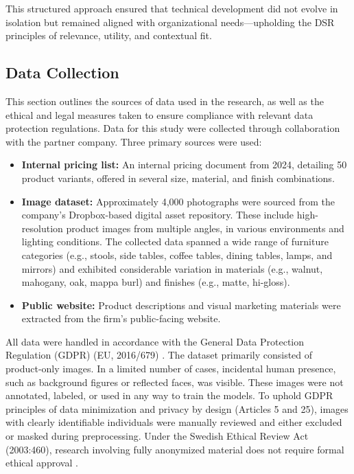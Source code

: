 \documentclass[a4paper,10pt,twocolumn]{article}
\numberwithin{figure}{section}
\numberwithin{table}{section}
\begin{document}
This structured approach ensured that technical development did not 
evolve in isolation but remained aligned with organizational needs—upholding 
the DSR principles of relevance, utility, and contextual fit. 

\subsection{Data Collection}

This section outlines the sources of data used 
in the research, as well as the ethical and legal 
measures taken to ensure compliance with relevant 
data protection regulations.
Data for this study were collected through 
collaboration with the partner company. 
Three primary sources were used:

\begin{itemize}
    \item \textbf{Internal pricing list:} An internal pricing document from 2024, detailing 50 product variants, offered in several size, material, and finish combinations.
    \item \textbf{Image dataset:} Approximately 4,000 photographs were sourced from the company's Dropbox-based digital asset repository. These include high-resolution product images from multiple angles, in various environments and lighting conditions. 
    The collected data spanned a wide range of furniture categories (e.g., stools, side tables, coffee tables, dining tables, 
    lamps, and mirrors) and exhibited considerable variation in materials (e.g., walnut, mahogany, oak, mappa burl) and finishes (e.g., matte, hi-gloss). 

    \item \textbf{Public website:} Product descriptions and visual marketing materials were extracted from the firm’s public-facing website.
\end{itemize}


All data were handled in accordance with the General Data Protection Regulation (GDPR) (EU, 2016/679) \citep{gdpr}. 
The dataset primarily consisted of product-only images. In a limited number of 
cases, incidental human presence, such as background figures or reflected faces, was visible. 
These images were not annotated, labeled, or used in any way to train the models.
To uphold GDPR principles of data minimization and privacy by design (Articles 5 and 25), 
images with clearly identifiable individuals were manually reviewed and either excluded 
or masked during preprocessing. Under the Swedish Ethical Review Act (2003:460), 
research involving fully anonymized material does not require formal 
ethical approval \citep{etik}.
\end{document}
